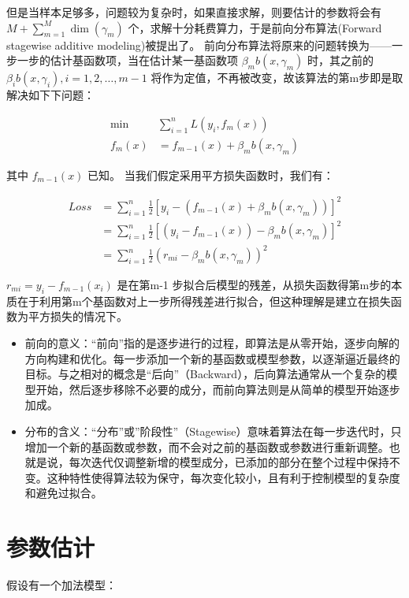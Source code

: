 \documentclass[
  letterpaper,
  DIV=11,
  numbers=noendperiod]{scrartcl}
\begin{document}
但是当样本足够多，问题较为复杂时，如果直接求解，则要估计的参数将会有
\(M+\sum_{m=1}^M\dim(\gamma_m)\)
个，求解十分耗费算力，于是前向分布算法(Forward stagewise additive
modeling)被提出了。
前向分布算法将原来的问题转换为------一步一步的估计基函数项，当在估计某一基函数项
\(\beta_mb(x,\gamma_m)\) 时，其之前的
\(\beta_ib(x,\gamma_i),i=1,2,\ldots,m-1\)
将作为定值，不再被改变，故该算法的第m步即是取解决如下下问题：

\[
\begin{aligned}
\min& \sum_{i=1}^nL(y_i,f_m(x))\\
f_m(x)&=f_{m-1}(x)+\beta_mb(x,\gamma_m)
\end{aligned}
\]

其中 \(f_{m-1}(x)\) 已知。 当我们假定采用平方损失函数时，我们有：

\[
\begin{aligned}
Loss&=\sum_{i=1}^n\frac 12[y_i-(f_{m-1}(x)+\beta_mb(x,\gamma_m))]^2\\
&=\sum_{i=1}^n\frac 12[(y_i-f_{m-1}(x))-\beta_mb(x,\gamma_m)]^2\\
&=\sum_{i=1}^n\frac 12(r_{mi}-\beta_mb(x,\gamma_m))^2
\end{aligned}
\]

\(r_{mi}=y_i-f_{m-1}(x_i)\) 是在第m-1
步拟合后模型的残差，从损失函数得第m步的本质在于利用第m个基函数对上一步所得残差进行拟合，但这种理解是建立在损失函数为平方损失的情况下。

\begin{itemize}
\item
  前向的意义：``前向''指的是逐步进行的过程，即算法是从零开始，逐步向解的方向构建和优化。每一步添加一个新的基函数或模型参数，以逐渐逼近最终的目标。与之相对的概念是``后向''（Backward），后向算法通常从一个复杂的模型开始，然后逐步移除不必要的成分，而前向算法则是从简单的模型开始逐步加成。
\item
  分布的含义：``分布''或''阶段性''（Stagewise）意味着算法在每一步迭代时，只增加一个新的基函数或参数，而不会对之前的基函数或参数进行重新调整。也就是说，每次迭代仅调整新增的模型成分，已添加的部分在整个过程中保持不变。这种特性使得算法较为保守，每次变化较小，且有利于控制模型的复杂度和避免过拟合。
\end{itemize}

\section{参数估计}\label{ux53c2ux6570ux4f30ux8ba1}

假设有一个加法模型：
\end{document}

